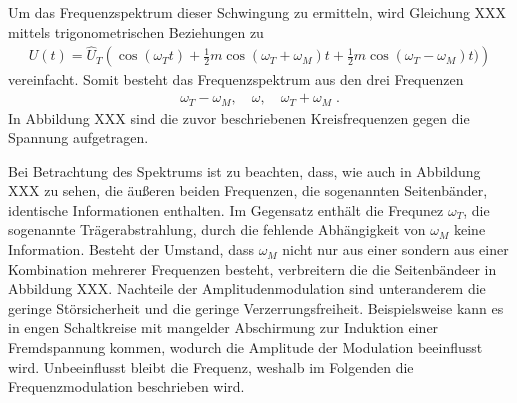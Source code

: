 
Um das Frequenzspektrum dieser Schwingung zu ermitteln, wird Gleichung XXX mittels trigonometrischen Beziehungen zu
\begin{align}
	U(t)=\hat{U}_T\left(\cos{(\omega_Tt)+\frac{1}{2}m\cos{(\omega_T+\omega_M)t}}+\frac{1}{2}m\cos{(\omega_T-\omega_M)t})\right)
\end{align}
vereinfacht. Somit besteht das Frequenzspektrum aus den drei Frequenzen
\begin{align}
	\omega_T-\omega_M,\quad\omega,\quad\omega_T+\omega_M\;.
\end{align}
In Abbildung XXX sind die zuvor beschriebenen Kreisfrequenzen gegen die Spannung aufgetragen.


Bei Betrachtung des Spektrums ist zu beachten, dass, wie auch in Abbildung XXX zu sehen, die äußeren beiden Frequenzen, die sogenannten Seitenbänder, identische Informationen enthalten. Im Gegensatz enthält die Frequnez $\omega_T$, die sogenannte Trägerabstrahlung, durch die fehlende Abhängigkeit von $\omega_M$ keine Information. Besteht der Umstand, dass $\omega_M$ nicht nur aus einer sondern aus einer Kombination mehrerer Frequenzen besteht, verbreitern die die Seitenbändeer in Abbildung XXX. Nachteile der Amplitudenmodulation sind unteranderem die geringe Störsicherheit und die geringe Verzerrungsfreiheit. Beispielsweise kann es in engen Schaltkreise mit mangelder Abschirmung zur Induktion einer Fremdspannung kommen, wodurch die Amplitude der Modulation beeinflusst wird. Unbeeinflusst bleibt die Frequenz, weshalb im Folgenden die Frequenzmodulation beschrieben wird.

